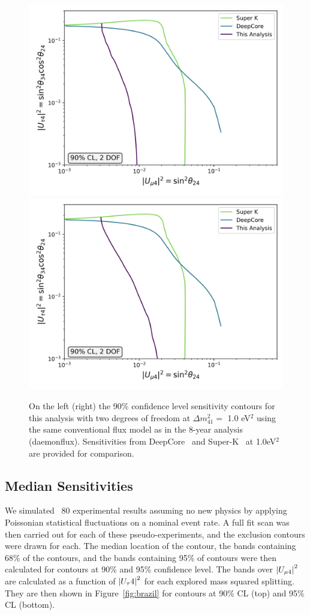 \documentclass[main.tex]{subfiles}
\begin{document}
\begin{figure}
    \centering
    \includegraphics[width=0.45\linewidth]{figures/comparison.png}%
    \includegraphics[width=0.45\linewidth]{figures/comparison_updated.png}
    \caption{On the left (right) the 90\% confidence level sensitivity contours for this analysis with two degrees of freedom at $\Delta m_{41}^{2}=$ 1.0 eV$^{2}$ using the same conventional flux model as in the 8-year analysis (daemonflux). Sensitivities from DeepCore~\cite{Aartsen_2017_dc} and Super-K~\cite{PhysRevD.91.052019} at 1.0eV$^{2}$ are provided for comparison.}\label{fig:experiment_compare}
\end{figure}


\subsection{Median Sensitivities}


We simulated ~80 experimental results assuming no new physics by applying Poissonian statistical fluctuations on a nominal event rate.
A full fit scan was then carried out for each of these pseudo-experiments, and the exclusion contours were drawn for each.
The median location of the contour, the bands containing 68\% of the contours, and the bands containing 95\% of contours were then calculated for contours at 90\% and 95\% confidence level. 
The bands over $\left| U_{\mu 4} \right|^{2}$ are calculated as a function of $\left| U_{\tau}4 \right|^{2}$ for each explored mass squared splitting. 
They are then shown in Figure~\ref{fig:brazil} for contours at 90\% CL (top) and 95\% CL (bottom).
\end{document}
